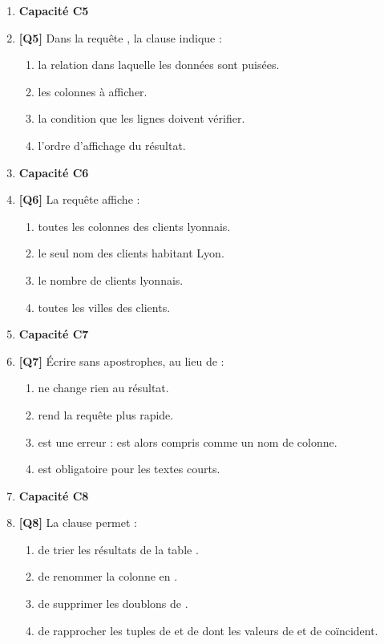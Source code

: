 \begin{enumerate}
\item[] \textbf{Capacité C5}

\item \textbf{[Q5]} Dans la requête , la clause  indique :
  \begin{enumerate}[label=\Alph*.]
    \item la relation dans laquelle les données sont puisées.
    \item les colonnes à afficher.
    \item la condition que les lignes doivent vérifier.
    \item l'ordre d'affichage du résultat.
  \end{enumerate}

\item[] \textbf{Capacité C6}

\item \textbf{[Q6]} La requête  affiche :
  \begin{enumerate}[label=\Alph*.]
    \item toutes les colonnes des clients lyonnais.
    \item le seul nom des clients habitant Lyon.
    \item le nombre de clients lyonnais.
    \item toutes les villes des clients.
  \end{enumerate}

\item[] \textbf{Capacité C7}

\item \textbf{[Q7]} Écrire  sans apostrophes, au lieu de  :
  \begin{enumerate}[label=\Alph*.]
    \item ne change rien au résultat.
    \item rend la requête plus rapide.
    \item est une erreur :  est alors compris comme un nom de colonne.
    \item est obligatoire pour les textes courts.
  \end{enumerate}

\item[] \textbf{Capacité C8}

\item \textbf{[Q8]} La clause  permet :
  \begin{enumerate}[label=\Alph*.]
    \item de trier les résultats de la table .
    \item de renommer la colonne  en .
    \item de supprimer les doublons de .
    \item de rapprocher les tuples de  et de  dont les valeurs de  et de  coïncident.
  \end{enumerate}


\end{enumerate}
